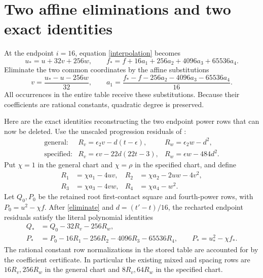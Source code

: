 \documentclass[11pt]{article}
\begin{document}
\section{Two affine eliminations and two exact identities}

At the endpoint \(i=16\), equation \eqref{interpolation} becomes
\[
 u_*=u+32v+256w,\qquad
 f_*=f+16a_1+256a_2+4096a_3+65536a_4.
\]
Eliminate the two common coordinates by the affine substitutions
\begin{equation}\label{eliminate}
 v=\frac{u_*-u-256w}{32},\qquad
 a_1=\frac{f_*-f-256a_2-4096a_3-65536a_4}{16}.
\end{equation}
All occurrences in the entire table receive these substitutions.
Because their coefficients are rational constants, quadratic degree
is preserved.

Here are the exact identities reconstructing the two endpoint power
rows that can now be deleted. Use the unscaled progression residuals
of \cite{Progression}:
\[
 \begin{array}{lll}
 \text{general}:&R_v=\epsilon_2v-d(t-\epsilon),
 &R_w=\epsilon_2w-d^2,\\
 \text{specified}:&R_v=\epsilon v-22d(22t-3),
 &R_w=\epsilon w-484d^2.
 \end{array}
\]
Put \(\chi=1\) in the general chart and \(\chi=\rho\)
in the specified chart, and define
\[
 \begin{aligned}
 R_1&=\chi a_1-4uv,&R_2&=\chi a_2-2uw-4v^2,\\
 R_3&=\chi a_3-4vw,&R_4&=\chi a_4-w^2.
 \end{aligned}
\]
Let \(Q_0,P_0\) be the retained root first-contact square and
fourth-power rows, with \(P_0=u^2-\chi f\).
After \eqref{eliminate} and \(d=(t'-t)/16\), the recharted
endpoint residuals satisfy the literal polynomial identities
\begin{equation}\label{identities}
 \begin{split}
 Q_*&=Q_0-32R_v-256R_w,\\
 P_*&=P_0-16R_1-256R_2-4096R_3-65536R_4,
 \qquad P_*=u_*^2-\chi f_*.
 \end{split}
\end{equation}
The rational constant row normalizations in the stored table are
accounted for by the coefficient certificate. In particular the
existing mixed and spacing rows are \(16R_v,256R_w\) in the
general chart and \(8R_v,64R_w\) in the specified chart.
\end{document}
